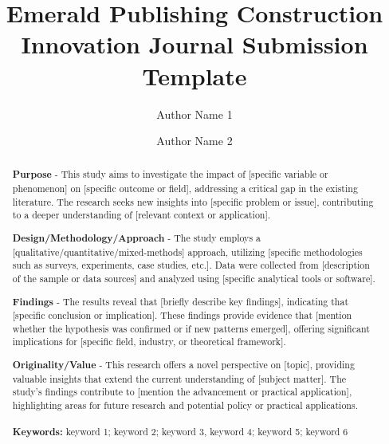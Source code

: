 \documentclass{article}
\author[1]{Author Name 1}
\author[2]{Author Name 2}
\affil[1]{Institute, Department, City, Country
email (corr. author)}
\affil[2]{Institute, Department, City, Country}
\title{Emerald Publishing Construction Innovation Journal Submission Template}
\begin{document}
\maketitle


\begin{abstract}
\textbf{Purpose} - This study aims to investigate the impact of [specific variable or phenomenon] on [specific outcome or field], addressing a critical gap in the existing literature. The research seeks new insights into [specific problem or issue], contributing to a deeper understanding of [relevant context or application].

\textbf{Design/Methodology/Approach} - The study employs a [qualitative/quantitative/mixed-methods] approach, utilizing [specific methodologies such as surveys, experiments, case studies, etc.]. Data were collected from [description of the sample or data sources] and analyzed using [specific analytical tools or software].

\textbf{Findings} - The results reveal that [briefly describe key findings], indicating that [specific conclusion or implication]. These findings provide evidence that [mention whether the hypothesis was confirmed or if new patterns emerged], offering significant implications for [specific field, industry, or theoretical framework].

\textbf{Originality/Value} - This research offers a novel perspective on [topic], providing valuable insights that extend the current understanding of [subject matter]. The study’s findings contribute to [mention the advancement or practical application], highlighting areas for future research and potential policy or practical applications. 
\\
\\
\textbf{Keywords:} keyword 1; keyword 2; keyword 3, keyword 4; keyword 5; keyword 6
\end{abstract}
\linenumbers
\end{document}
